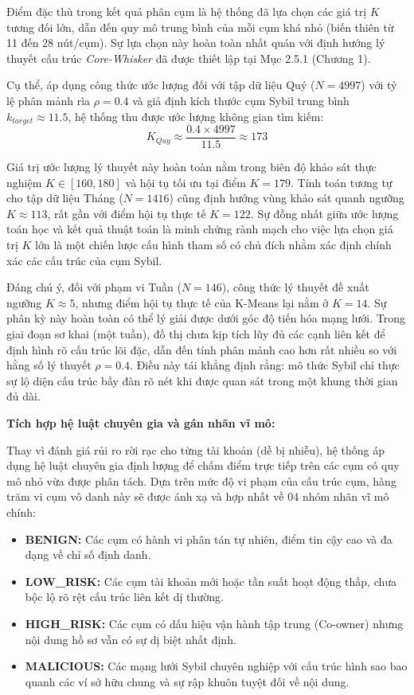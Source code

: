 \indent\indent Điểm đặc thù trong kết quả phân cụm là hệ thống đã lựa chọn các giá trị $K$ tương đối lớn, dẫn đến quy mô trung bình của mỗi cụm khá nhỏ (biến thiên từ 11 đến 28 nút/cụm). Sự lựa chọn này hoàn toàn nhất quán với định hướng lý thuyết cấu trúc \textit{Core-Whisker} đã được thiết lập tại Mục 2.5.1 (Chương 1).\vspace{0.3cm}

Cụ thể, áp dụng công thức ước lượng đối với tập dữ liệu Quý ($N=4997$) với tỷ lệ phân mảnh rìa $\rho = 0.4$ và giả định kích thước cụm Sybil trung bình $k_{target} \approx 11.5$, hệ thống thu được ước lượng không gian tìm kiếm:
\[
    K_{Quy} \approx \frac{0.4 \times 4997}{11.5} \approx 173
\]

Giá trị ước lượng lý thuyết này hoàn toàn nằm trong biên độ khảo sát thực nghiệm $K \in [160, 180]$ và hội tụ tối ưu tại điểm $K=179$. Tính toán tương tự cho tập dữ liệu Tháng ($N=1416$) cũng định hướng vùng khảo sát quanh ngưỡng $K \approx 113$, rất gần với điểm hội tụ thực tế $K=122$. Sự đồng nhất giữa ước lượng toán học và kết quả thuật toán là minh chứng rành mạch cho việc lựa chọn giá trị $K$ lớn là một chiến lược cấu hình tham số có chủ đích nhằm xác định chính xác các cấu trúc của cụm Sybil.\vspace{0.3cm}

Đáng chú ý, đối với phạm vi Tuần ($N=146$), công thức lý thuyết đề xuất ngưỡng $K \approx 5$, nhưng điểm hội tụ thực tế của K-Means lại nằm ở $K=14$. Sự phân kỳ này hoàn toàn có thể lý giải được dưới góc độ tiến hóa mạng lưới. Trong giai đoạn sơ khai (một tuần), đồ thị chưa kịp tích lũy đủ các cạnh liên kết để định hình rõ cấu trúc lõi đặc, dẫn đến tính phân mảnh cao hơn rất nhiều so với hằng số lý thuyết $\rho = 0.4$. Điều này tái khẳng định rằng: mô thức Sybil chỉ thực sự lộ diện cấu trúc bầy đàn rõ nét khi được quan sát trong một khung thời gian đủ dài.\vspace{0.3cm}

\textbf{Tích hợp hệ luật chuyên gia và gán nhãn vĩ mô:}\vspace{0.2cm}

Thay vì đánh giá rủi ro rời rạc cho từng tài khoản (dễ bị nhiễu), hệ thống áp dụng hệ luật chuyên gia định lượng để chấm điểm trực tiếp trên các cụm có quy mô nhỏ vừa được phân tách. Dựa trên mức độ vi phạm của cấu trúc cụm, hàng trăm vi cụm vô danh này sẽ được ánh xạ và hợp nhất về 04 nhóm nhãn vĩ mô chính:
\begin{itemize}[label={--}, itemsep=1pt]
    \item \textbf{BENIGN:} Các cụm có hành vi phân tán tự nhiên, điểm tin cậy cao và đa dạng về chỉ số định danh.
    \item \textbf{LOW\_RISK:} Các cụm tài khoản mới hoặc tần suất hoạt động thấp, chưa bộc lộ rõ rệt cấu trúc liên kết dị thường.
    \item \textbf{HIGH\_RISK:} Các cụm có dấu hiệu vận hành tập trung (Co-owner) nhưng nội dung hồ sơ vẫn có sự dị biệt nhất định.
    \item \textbf{MALICIOUS:} Các mạng lưới Sybil chuyên nghiệp với cấu trúc hình sao bao quanh các ví sở hữu chung và sự rập khuôn tuyệt đối về nội dung.
\end{itemize}

